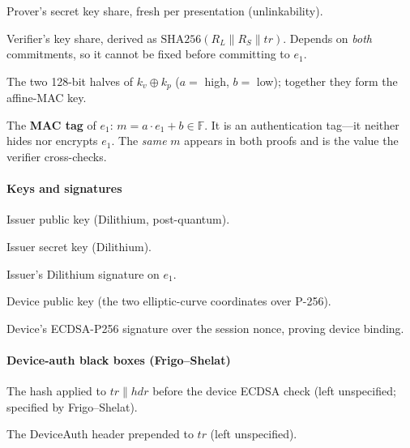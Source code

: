 \documentclass{article}
\newcommand{\FF}{\mathbb{F}}
\newcommand{\concat}{\mathbin{\|}}
\newcommand{\SHA}{\mathrm{SHA256}}
\begin{document}
\begin{description}[leftmargin=3.5em, labelwidth=3em, style=sameline, itemsep=2pt]
  \item[$k_p$]   Prover's secret key share, fresh per presentation (unlinkability).
  \item[$k_v$]   Verifier's key share, derived as
                 $\SHA(R_L \concat R_S \concat tr)$. Depends on \emph{both}
                 commitments, so it cannot be fixed before committing to $e_1$.
  \item[$a,b$]   The two 128-bit halves of $k_v \oplus k_p$ ($a = $ high,
                 $b = $ low); together they form the affine-MAC key.
  \item[$m$]     The \textbf{MAC tag} of $e_1$: $m = a \cdot e_1 + b \in \FF$.
                 It is an authentication tag---it neither hides nor encrypts
                 $e_1$. The \emph{same} $m$ appears in both proofs and is the
                 value the verifier cross-checks.
\end{description}

\paragraph*{Keys and signatures}

\begin{description}[leftmargin=3.5em, labelwidth=3em, style=sameline, itemsep=2pt]
  \item[$PK_{II}$]         Issuer public key (Dilithium, post-quantum).
  \item[$SK_{II}$]         Issuer secret key (Dilithium).
  \item[$sign$]            Issuer's Dilithium signature on $e_1$.
  \item[$pk_{dx},pk_{dy}$] Device public key (the two elliptic-curve coordinates
                           over P-256).
  \item[$(r_2,s_2)$]       Device's ECDSA-P256 signature over the session nonce,
                           proving device binding.
\end{description}

\paragraph*{Device-auth black boxes (Frigo--Shelat)}

\begin{description}[leftmargin=3.5em, labelwidth=3em, style=sameline, itemsep=2pt]
  \item[$H$]    The hash applied to $tr \concat hdr$ before the device ECDSA
                check (left unspecified; specified by Frigo--Shelat).
  \item[$hdr$]  The DeviceAuth header prepended to $tr$ (left unspecified).
\end{description}
\end{document}
